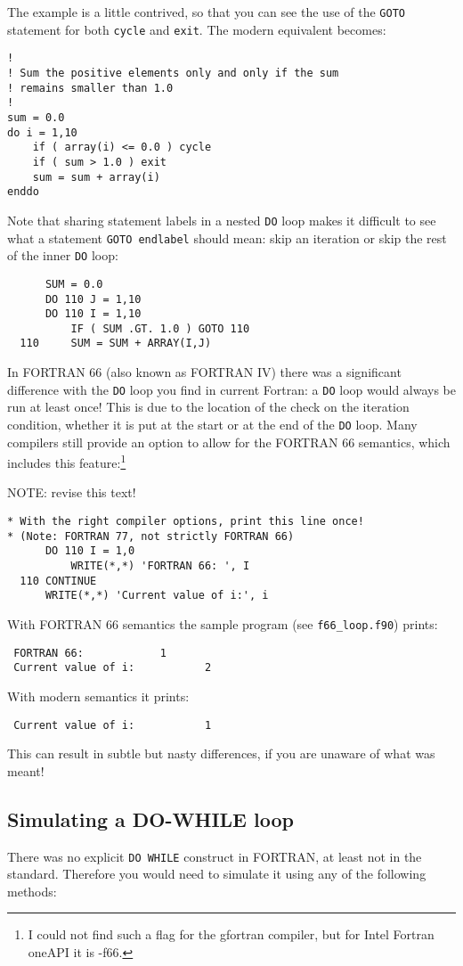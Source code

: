 %
The example is a little contrived, so that you can see the use of the \verb+GOTO+ statement
for both \verb+cycle+ and \verb+exit+. The modern equivalent becomes:
%
\begin{verbatim}
!
! Sum the positive elements only and only if the sum
! remains smaller than 1.0
!
sum = 0.0
do i = 1,10
    if ( array(i) <= 0.0 ) cycle
    if ( sum > 1.0 ) exit
    sum = sum + array(i)
enddo
\end{verbatim}
%
Note that sharing statement labels in a nested \verb+DO+ loop makes it difficult to
see what a statement \verb+GOTO endlabel+ should mean: skip an iteration or skip
the rest of the inner \verb+DO+ loop:
%
\begin{verbatim}
      SUM = 0.0
      DO 110 J = 1,10
      DO 110 I = 1,10
          IF ( SUM .GT. 1.0 ) GOTO 110
  110     SUM = SUM + ARRAY(I,J)
\end{verbatim}
%
In FORTRAN 66 (also known as FORTRAN IV) there was a significant difference with
the \verb+DO+ loop you find in current Fortran: a \verb+DO+ loop would always
be run at least once! This is due to the location of the check on the iteration
condition, whether it is put at the start or at the end of the \verb+DO+ loop.
Many compilers still provide an option to allow for the FORTRAN 66 semantics,\cite{Intel}
which includes this feature:\footnote{I could not find such a flag for the
gfortran compiler, but for Intel Fortran oneAPI it is -f66.}

NOTE: revise this text!
%
\begin{verbatim}
* With the right compiler options, print this line once!
* (Note: FORTRAN 77, not strictly FORTRAN 66)
      DO 110 I = 1,0
          WRITE(*,*) 'FORTRAN 66: ', I
  110 CONTINUE
      WRITE(*,*) 'Current value of i:', i
\end{verbatim}
%
With FORTRAN 66 semantics the sample program (see \verb+f66_loop.f90+) prints:
%
\begin{verbatim}
 FORTRAN 66:            1
 Current value of i:           2
\end{verbatim}
With modern semantics it prints:
%
\begin{verbatim}
 Current value of i:           1
\end{verbatim}
%
This can result in subtle but nasty differences, if you are unaware of what
was meant!


\subsection{Simulating a DO-WHILE loop}
There was no explicit \verb+DO WHILE+ construct in FORTRAN, at least not
in the standard. Therefore you would need to simulate it using any of the
following methods:

